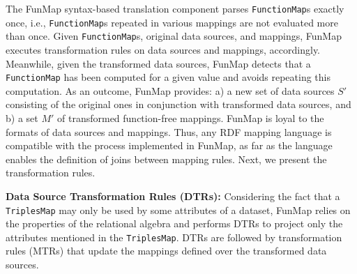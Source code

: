 The FunMap syntax-based translation component parses \verb|FunctionMap|s exactly once, i.e., \verb|FunctionMap|s repeated in various mappings are not evaluated more than once. Given \verb|FunctionMap|s, original data sources, and mappings, FunMap executes transformation rules on data sources and mappings, accordingly. Meanwhile, given the transformed data sources, FunMap detects that a \verb|FunctionMap| has been computed for a given value and avoids repeating this computation. As an outcome, FunMap provides: a) a new set of data sources $S'$ consisting of the original ones in conjunction with transformed data sources,  and b) a set $M'$ of transformed function-free mappings. FunMap is loyal to the formats of data sources and mappings. Thus, any RDF mapping language is compatible with the process implemented in FunMap, as far as the language enables the definition of joins between mapping rules. Next, we present the transformation rules. 

\noindent\textbf{Data Source Transformation Rules (DTRs):}
Considering the fact that a \verb|TriplesMap| may only be used by some attributes of a dataset, FunMap relies on the properties of the relational algebra and performs DTRs to project only the attributes mentioned in the \verb|TriplesMap|. DTRs are followed by transformation rules (MTRs) that update the mappings defined over the transformed data sources. 

